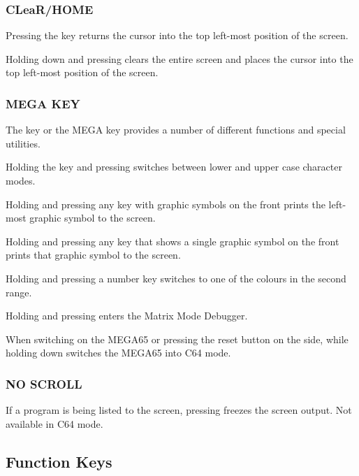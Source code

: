 \subsubsection{CLeaR/HOME}

Pressing the  key returns the cursor into the top left-most position of the screen.

Holding down  and pressing  clears the entire screen and places the cursor into the top left-most position of the screen.

\subsubsection{MEGA KEY}

The \megasymbolkey key or the MEGA key provides a number of different functions and special utilities.

Holding the  key and pressing \megasymbolkey switches between lower and upper case character modes.

Holding \megasymbolkey and pressing any key with graphic symbols on the front prints the left-most graphic symbol to the screen.

Holding \megasymbolkey and pressing any key that shows a single graphic symbol on the front prints that graphic symbol to the screen.

Holding \megasymbolkey and pressing a number key switches to one of the colours in the second range.

Holding \megasymbolkey and pressing  enters the Matrix Mode Debugger.

When switching on the MEGA65 or pressing the reset button on the side, while holding down \megasymbolkey switches the MEGA65 into C64 mode.

\subsubsection{NO SCROLL}
If a program is being listed to the screen, pressing  freezes the screen output. Not available in C64 mode.


\subsection{Function Keys}

